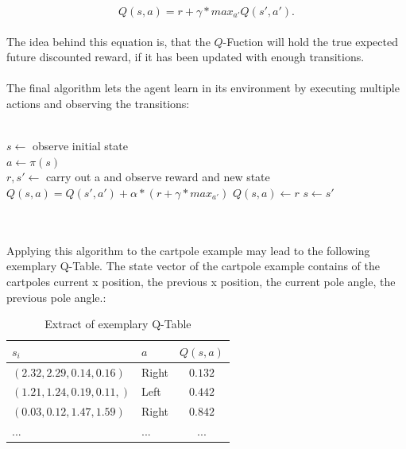 \begin{equation*}
Q(s, a) = r + \gamma * max_{a'}Q(s', a').
\end{equation*}
\\
The idea behind this equation is, that the $Q$-Fuction will hold the true expected future discounted reward, if it has been updated with enough transitions. 
\\
\\
The final algorithm lets the agent learn in its environment by executing multiple actions and observing the transitions: 
\\
\\
\begin{algorithm}[H]
	 {
		$ s \leftarrow $ observe initial state \\
		 {
			$ a \leftarrow \pi(s) $	\\
			$ r, s' \leftarrow$ carry out a and observe reward and new state 		\\
			 {
				$ Q(s, a) = Q(s', a') + \alpha * (r + \gamma * max_{a'}) $
			} {
				$ Q(s, a) \leftarrow r $
			}
			$ s \leftarrow s' $
		}
	}
\end{algorithm}
~\\
\\
Applying this algorithm to the cartpole example may lead to the following exemplary Q-Table. The state vector of the cartpole example contains of the cartpoles current x position, the previous x position, the current pole angle, the previous pole angle.: 
\\
\begin{table}[h]
  \centering
  \begin{tabular}[c]{llc}
    \hline
    $s_i$												& $a$ 		& 	$Q(s, a)$				\\
    \hline
    $(2.32, 2.29, 0.14, 0.16)$ 				& Right 	& $0.132 $  			\\
    $(1.21, 1.24, 0.19, 0.11,)$ 			& Left 	& $0.442$   				\\
    $(0.03, 0.12, 1.47, 1.59)$ 				& Right 	& $0.842$   				\\
    ... 																& ...			& ... 				\\
    \hline
  \end{tabular}
  \caption{Extract of exemplary Q-Table}
  \label{tab:qtable}
\end{table}


